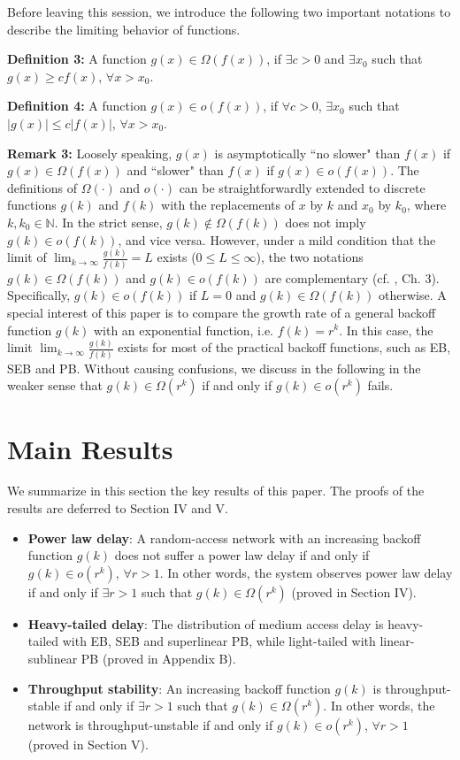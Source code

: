 \documentclass[journal]{IEEEtran}
\begin{document}
Before leaving this session, we introduce the following two important notations to describe the limiting behavior of functions.

\textbf{Definition 3:} A function $g(x)\in \Omega(f(x))$, if $\exists c>0$ and $\exists x_0$ such that $g(x)\geq cf(x)$, $\forall x>x_0$.

\textbf{Definition 4:} A function $g(x)\in o(f(x))$, if $\forall c>0$, $\exists x_0$ such that $|g(x)|\leq c|f(x)|$, $\forall x>x_0$.

\textbf{Remark 3:} Loosely speaking, $g(x)$ is asymptotically ``no slower" than $f(x)$ if $g(x) \in \Omega\left(f(x)\right)$ and ``slower" than $f(x)$ if $g(x) \in o\left(f(x)\right)$. The definitions of $\Omega(\cdot)$ and $o(\cdot)$ can be straightforwardly extended to discrete functions $g(k)$ and $f(k)$ with the replacements of $x$ by $k$ and $x_0$ by $k_0$, where $k,k_0\in\mathbb{N}$. In the strict sense, $g(k)\notin \Omega\left(f(k)\right)$ does not imply $g(k)\in o\left(f(k)\right)$, and vice versa. However, under a mild condition that the limit of $\lim_{k\rightarrow \infty} \frac{g(k)}{f(k)} = L$ exists ($0 \leq L\leq \infty$), the two notations $g(k)\in \Omega\left(f(k)\right)$ and $g(k)\in o\left(f(k)\right)$ are complementary (cf. \cite{2009:Cormen}, Ch. 3). Specifically, $g(k)\in o\left(f(k)\right)$ if $L=0$ and $g(k)\in \Omega\left(f(k)\right)$ otherwise. A special interest of this paper is to compare the growth rate of a general backoff function $g(k)$ with an exponential function, i.e. $f(k)=r^k$. In this case, the limit $\lim_{k\rightarrow \infty} \frac{g(k)}{f(k)}$ exists for most of the practical backoff functions, such as EB, SEB and PB. Without causing confusions, we discuss in the following in the weaker sense that $g(k)\in \Omega(r^k)$ if and only if $g(k)\in o(r^k)$ fails.

\section{Main Results}
We summarize in this section the key results of this paper. The proofs of the results are deferred to Section IV and V.
\begin{itemize}
  \item \textbf{Power law delay}: A random-access network with an increasing backoff function $g(k)$ does not suffer a power law delay if and only if $g(k)\in o\left(r^k\right)$, $\forall r>1$. In other words, the system observes power law delay if and only if $\exists r>1$ such that $g(k)\in\Omega(r^k)$ (proved in Section IV).
    \item \textbf{Heavy-tailed delay}: The distribution of medium access delay is heavy-tailed with EB, SEB and superlinear PB, while light-tailed with linear-sublinear PB (proved in Appendix B).
  \item \textbf{Throughput stability}: An increasing backoff function $g(k)$ is throughput-stable if and only if $\exists r>1$ such that $g(k)\in\Omega\left(r^k\right)$. In other words, the network is throughput-unstable if and only if $g(k)\in o\left(r^k\right)$, $\forall r>1$ (proved in Section V).
\end{itemize}
\end{document}
